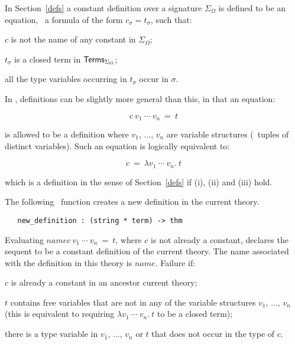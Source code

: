 In Section~\ref{defs} a constant definition
over a signature $\Sigma_{\Omega}$ is defined to be
an equation, \ie\ a formula of the form $c_{\sigma}=t_{\sigma}$,
such that:
\begin{myenumerate}
\item $c$ is not the name of any constant in $\Sigma_{\Omega}$;
\item $t_{\sigma}$ is a closed term in ${\sf Terms}_{\Sigma_{\Omega}}$;
\item all the type variables occurring in $t_{\sigma}$ occur in $\sigma$.
\end{myenumerate}

In \HOL, definitions can be slightly more general than this, in that
an equation:

\[ c\ v_1\ \cdots\ v_n\ =\ t \]

\noindent is  allowed  to  be a  definition where  $v_1$, $\dots$, $v_n$ are
variable structures (\ie\ tuples of distinct variables).   Such  an equation is
logically equivalent to:

\[ c\ =\ \lambda v_1\ \cdots\ v_n.\  t \]

\noindent which is a definition in the sense of  Section~\ref{defs} if (i),
(ii) and (iii) hold.

The following  \ML\ function  creates a  new definition in
the current theory.

\begin{boxed}
\begin{verbatim}
   new_definition : (string * term) -> thm
\end{verbatim}\end{boxed}


\noindent Evaluating
 $name$$c\ v_1\ \cdots\ v_n\ =\ t$\ml{)},
where $c$ is not already a constant, declares the sequent
 to be a constant definition
of the current theory. The name associated with the definition in
this theory is $name$.
Failure if:
\begin{myenumerate}
\item $c$ is already a constant in an ancestor current theory;
\item $t$ contains free variables that are not in any of
the variable structures $v_1$, $\dots$, $v_n$ (this is equivalent
to requiring $\lambda v_1\ \cdots\ v_n.\  t$ to be a closed term);
\item there is a type variable in  $v_1$, $\dots$, $v_n$ or $t$
that does not occur in the type of $c$.
\end{myenumerate}

